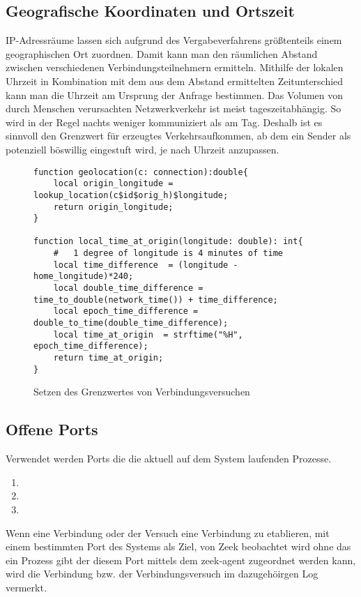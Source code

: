 \subsection{Geografische Koordinaten und Ortszeit}
IP-Adressräume lassen sich aufgrund des Vergabeverfahrens größtenteils einem geographischen Ort zuordnen. Damit kann man den räumlichen Abstand zwischen verschiedenen Verbindungsteilnehmern ermitteln. Mithilfe der lokalen Uhrzeit in Kombination mit dem aus dem Abstand ermittelten Zeitunterschied kann man die Uhrzeit am Ursprung der Anfrage bestimmen. Das Volumen von durch Menschen verursachten Netzwerkverkehr ist meist tageszeitabhängig. So wird in der Regel nachts weniger kommuniziert als am Tag.  Deshalb ist es sinnvoll den Grenzwert für erzeugtes Verkehrsaufkommen, ab dem ein Sender als potenziell böswillig eingestuft wird, je nach Uhrzeit anzupassen.
\begin{figure}[H]
\begin{lstlisting}
function geolocation(c: connection):double{
	local origin_longitude = lookup_location(c$id$orig_h)$longitude;
	return origin_longitude;
}

function local_time_at_origin(longitude: double): int{
	#	1 degree of longitude is 4 minutes of time
	local time_difference  = (longitude - home_longitude)*240;
	local double_time_difference = time_to_double(network_time()) + time_difference;
	local epoch_time_difference = double_to_time(double_time_difference);
	local time_at_origin  = strftime("%H", epoch_time_difference);
	return time_at_origin;
}
\end{lstlisting}
\caption{Setzen des Grenzwertes von Verbindungsversuchen}
\end{figure}
\pagebreak
\subsection{Offene Ports}
Verwendet werden Ports die die aktuell auf dem System laufenden Prozesse.
\begin{enumerate}
\item{}
\item{}
\item{}
\end{enumerate}

 Wenn eine Verbindung oder der Versuch eine Verbindung zu etablieren, mit einem bestimmten Port des Systems als Ziel, von Zeek beobachtet wird ohne das ein Prozess gibt der diesem Port mittels dem zeek-agent zugeordnet werden kann, wird die Verbindung bzw. der Verbindungsversuch im dazugehöirgen Log vermerkt.

